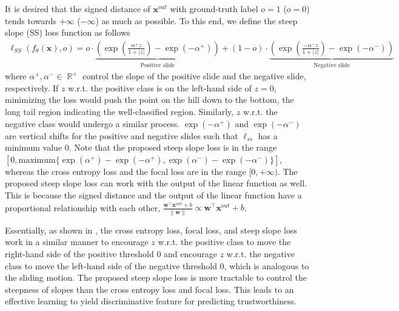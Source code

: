It is desired that the signed distance of $\bm{x}^{out}$ with ground-truth label $o=1$ ($o=0$) tends towards $+\infty$ ($-\infty$) as much as possible.
To this end, we define the steep slope (SS) loss function as follows
{\small
\begin{align}
    \ell_{SS} (f_{\theta}(\bm{x}), o) = o\cdot \underbrace{\left( \exp \left( \frac{\alpha^{+}z}{1+|z|} \right) - \exp(-\alpha^{+}) \right)}_{\text{Positive slide}}
    + (1-o)\cdot \underbrace{\left( \exp \left( \frac{-\alpha^{-}z}{1+|z|} \right) -  \exp(-\alpha^{-})\right)}_{\text{Negative slide}} \label{eqn:loss_ss}
\end{align}}
where $\alpha^{+},\alpha^{-}\in \mathop{\mathbb{R}}^{+}$ control the slope of the positive slide and the negative slide, respectively. If $z$ w.r.t. the positive class is on the left-hand side of $z=0$, minimizing the loss would push the point on the hill down to the bottom, \ie the long tail region indicating the well-classified region. Similarly, $z$ w.r.t. the negative class would undergo a similar process. $\exp(-\alpha^{+})$ and $\exp(-\alpha^{-})$ are vertical shifts for the positive and negative slides such that $\ell_{ss}$ has a minimum value 0. Note that the proposed steep slope loss is in the range $[0, \text{maximum}\{\exp(\alpha^{+})-\exp(-\alpha^{+}), \exp(\alpha^{-})-\exp(-\alpha^{-})\}]$, whereas the cross entropy loss and the focal loss are in the range $[0, +\infty)$.
The proposed steep slope loss can work with the output of the linear function as well. 
This is because the signed distance and the output of the linear function have a proportional relationship with each other, \ie $\frac{\bm{w}^{\top} \bm{x}^{out}+b}{\|\bm{w}\|} \propto \bm{w}^{\top}\bm{x}^{out}+b$.

Essentially, as shown in , the cross entropy loss, focal loss, and steep slope loss work in a similar manner to encourage $z$ w.r.t. the positive class to move the right-hand side of the positive threshold 0 and encourage $z$ w.r.t. the negative class to move the left-hand side of the negative threshold 0, which is analogous to the sliding motion. The proposed steep slope loss is more tractable to control the steepness of slopes than the cross entropy loss and focal loss. This leads to an effective learning to yield discriminative feature for predicting trustworthiness. 

